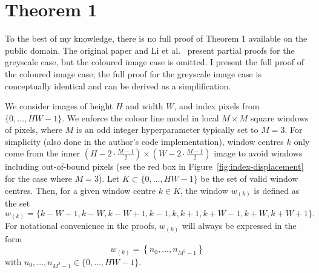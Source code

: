 \documentclass{article}
\theoremstyle{definition}
\begin{document}
\newpage
\section{Theorem 1} \label{appendix:theorem-1}
To the best of my knowledge, there is no full proof of Theorem 1 available on the public domain. The original paper \cite{closed-form-matting} and Li et al.\ \cite{closed-form-survey} present partial proofs for the greyscale case, but the coloured image case is omitted. I present the full proof of the coloured image case; the full proof for the greyscale image case is conceptually identical and can be derived as a simplification.

We consider images of height $H$ and width $W$, and index pixels from $\{0,\dots,HW-1\}$. We enforce the colour line model \cite[Theorem 2]{closed-form-matting} in local $M\times M$ square windows of pixels, where $M$ is an odd integer hyperparameter typically set to $M=3$. For simplicity (also done in the author's code implementation), window centres $k$ only come from the inner $\left(H-2\cdot \frac{M-1}{2}\right)\times \left(W-2\cdot \frac{M-1}{2}\right)$ image to avoid windows including out-of-bound pixels (see the red box in Figure~\ref{fig:index-displacement} for the case where $M=3$). Let $K\subset \{0,\dots,HW-1\}$ be the set of valid window centres. Then, for a given window centre $k\in K$, the window $w_{(k)}$ is defined as the set
$$ w_{(k)} = \{k-W-1, k-W, k-W+1, k-1, k, k+1, k+W-1, k+W, k+W+1\}.$$
For notational convenience in the proofs, $w_{(k)}$ will always be expressed in the form
$$w_{(k)} = \left\{n_0, \dots, n_{M^2-1} \right\}$$
with $n_0,\dots,n_{M^2-1}\in\{0,\dots,HW-1\}$.
\end{document}
